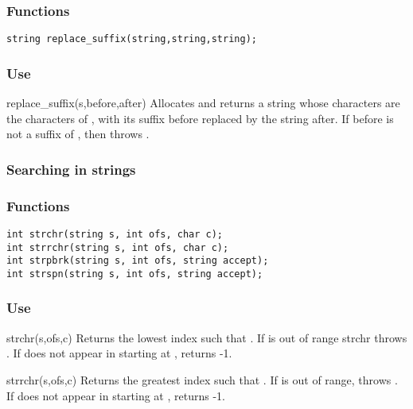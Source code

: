 \subsubsection*{Functions}
\begin{verbatim}
string replace_suffix(string,string,string);
\end{verbatim}

\subsubsection*{Use}

\begin{defun}{replace_suffix}{(s,before,after)}
Allocates and returns a string whose characters are the characters of
, with its suffix before replaced by the string after.  If before
is not a suffix of , then  throws
.
\end{defun}

\subsubsection*{Searching in strings}
\subsubsection*{Functions}
\begin{verbatim}
int strchr(string s, int ofs, char c);
int strrchr(string s, int ofs, char c);
int strpbrk(string s, int ofs, string accept);
int strspn(string s, int ofs, string accept);
\end{verbatim}

\subsubsection*{Use}

\begin{defun}{strchr}{(s,ofs,c)}
Returns the lowest index  such that
.  If  is out of range strchr
throws .  If  does not
appear in  starting at ,  returns -1.
\end{defun}

\begin{defun}{strrchr}{(s,ofs,c)}
Returns the greatest index  such that
.  If  is out of range,
 throws .  If
 does not appear in  starting at , 
returns -1.
\end{defun}

